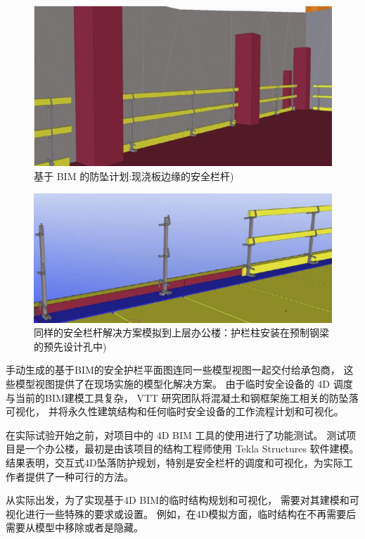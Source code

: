 \begin{figure}[thbp!]
    \centering
    \includegraphics[width=1.0\linewidth]{res/c4f2.png}
    \caption{基于 BIM 的防坠计划:现浇板边缘的安全栏杆)}
    \label{fig:c4f2}
\end{figure}

\begin{figure}[thbp!]
    \centering
    \includegraphics[width=1.0\linewidth]{res/c4f3.png}
    \caption{同样的安全栏杆解决方案模拟到上层办公楼：护栏柱安装在预制钢梁的预先设计孔中)}
    \label{fig:c4f3}
\end{figure}

手动生成的基于BIM的安全护栏平面图连同一些模型视图一起交付给承包商，
这些模型视图提供了在现场实施的模型化解决方案。
由于临时安全设备的 4D 调度与当前的BIM建模工具复杂，
VTT 研究团队将混凝土和钢框架施工相关的防坠落可视化，
并将永久性建筑结构和任何临时安全设备的工作流程计划和可视化。

在实际试验开始之前，对项目中的 4D BIM 工具的使用进行了功能测试。
测试项目是一个办公楼，最初是由该项目的结构工程师使用 Tekla Structures 软件建模。
结果表明，交互式4D坠落防护规划，特别是安全栏杆的调度和可视化，为实际工作者提供了一种可行的方法。

从实际出发，为了实现基于4D BIM的临时结构规划和可视化，
需要对其建模和可视化进行一些特殊的要求或设置。
例如，在4D模拟方面，临时结构在不再需要后需要从模型中移除或者是隐藏。\\

